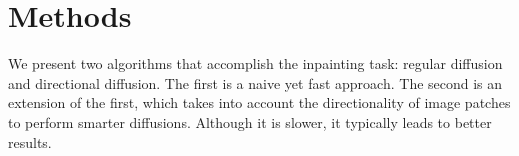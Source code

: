 \section{Methods}
\label{sec:methods}

We present two algorithms that accomplish the inpainting task: regular diffusion and directional diffusion. The first is a naive yet fast approach. The second is an extension of the first, which takes into account the directionality of image patches to perform smarter diffusions. Although it is slower, it typically leads to better results.





